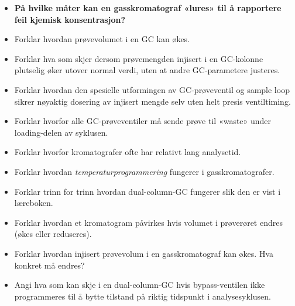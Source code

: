 \begin{itemize}
\item{} {\bf På hvilke måter kan en gasskromatograf «lures» til å rapportere feil kjemisk konsentrasjon?}
\item{} Forklar hvordan prøvevolumet i en GC kan økes.
\item{} Forklar hva som skjer dersom prøvemengden injisert i en GC-kolonne plutselig øker utover normal verdi, uten at andre GC-parametere justeres.
\item{} Forklar hvordan den spesielle utformingen av GC-prøveventil og sample loop sikrer nøyaktig dosering av injisert mengde selv uten helt presis ventiltiming.
\item{} Forklar hvorfor alle GC-prøveventiler må sende prøve til «waste» under loading-delen av syklusen.
\item{} Forklar hvorfor kromatografer ofte har relativt lang analysetid.
\item{} Forklar hvordan {\it temperaturprogrammering} fungerer i gasskromatografer.
\item{} Forklar trinn for trinn hvordan dual-column-GC fungerer slik den er vist i læreboken.
\item{} Forklar hvordan et kromatogram påvirkes hvis volumet i prøverøret endres (økes eller reduseres).
\item{} Forklar hvordan injisert prøvevolum i en gasskromatograf kan økes. Hva konkret må endres?
\item{} Angi hva som kan skje i en dual-column-GC hvis bypass-ventilen ikke programmeres til å bytte tilstand på riktig tidspunkt i analysesyklusen.
\end{itemize}




